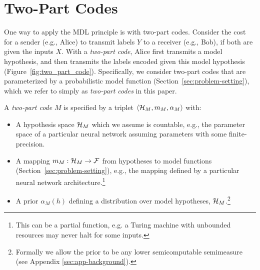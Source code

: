 \vspace{-0.1cm}
\section{Two-Part Codes} 
\label{sec:two-part-codes}
\vspace{-0.1cm}

One way to apply the MDL principle is with two-part codes. Consider the cost for a sender (e.g., Alice) to transmit labels $Y$ to a receiver (e.g., Bob), if both are given the inputs $X$. With a \emph{two-part code}, Alice first transmits a model hypothesis, and then transmits the labels encoded given this model hypothesis (Figure~\ref{fig:two_part_code}). Specifically, we consider two-part codes that are parameterized by a probabilistic model function (Section~\ref{sec:problem-setting}), which we refer to simply as \emph{two-part codes} in this paper.

\begin{defn} A \emph{two-part code} $M$ is specified by a triplet $\langle {\mathcal{H}}_M, m_M, \alpha_M \rangle$ with:%
\begin{itemize}
    \item A hypothesis space ${\mathcal{H}}_M$ which we assume is countable, e.g., the parameter space of a particular neural network assuming parameters with some finite-precision.
    \item A mapping $m_M : {\mathcal{H}}_M \rightarrow {\mathcal{F}}$ from hypotheses to model functions (Section~\ref{sec:problem-setting}), e.g., the mapping defined by a particular neural network architecture.\footnote{This can be a partial function, e.g. a Turing machine with unbounded resources may never halt for some inputs.}
    \item A prior $\alpha_M(h)$ defining a distribution over model hypotheses, ${\mathcal{H}}_M$.\footnote{Formally we allow the prior to be any lower semicomputable semimeasure (see Appendix \ref{sec:app-background}).}
\end{itemize}
\label{def:two-part-code}\end{defn}



